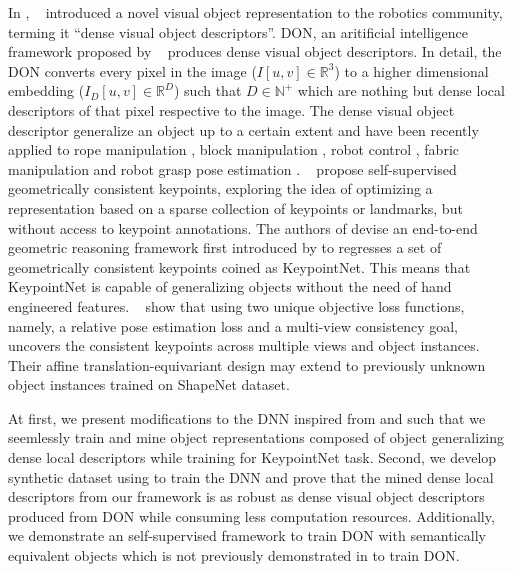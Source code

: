 In \citeyear{florence2018dense}, \citeauthor{florence2018dense}~\cite{florence2018dense} introduced a novel visual
object representation to the robotics community,  terming it ``dense visual object descriptors''. DON, an aritificial intelligence
framework proposed by
~\cite{florence2018dense} produces dense visual object descriptors. In detail, the DON converts every pixel in the
image ($I[u, v] \in \mathbb{R}^3$) to a higher dimensional embedding ($I_D[u, v] \in \mathbb{R}^D$) such that $D \in \mathbb{N}^+$
which are nothing but dense local descriptors
of that pixel respective to the image. The dense visual object descriptor generalize an object up to a certain extent and have been recently
applied to rope manipulation \cite{rope-manipulation},
block manipulation \cite{block-manipulation}, robot control \cite{florence2019self}, fabric manipulation \cite{fabric-manipulation} and
robot grasp pose estimation \parencites{kupcsik2021supervised}{adrian2022efficient}. \citeauthor{suwajanakorn2018discovery}~\cite{suwajanakorn2018discovery}
propose self-supervised geometrically consistent keypoints, exploring the idea of optimizing a representation
based on a sparse collection of keypoints or landmarks, but without access to keypoint annotations. The authors of \cite{suwajanakorn2018discovery}
devise an end-to-end geometric reasoning framework
first introduced by \cite{levine2016end} to regresses a set of geometrically consistent keypoints coined as KeypointNet.
This means that KeypointNet is capable of generalizing objects without the need of hand engineered features.
\citeauthor{suwajanakorn2018discovery}~\cite{suwajanakorn2018discovery} show that using two unique objective loss
functions, namely, a relative pose
estimation loss and a multi-view consistency goal, uncovers the consistent keypoints across multiple views and object instances.
Their affine translation-equivariant design may extend to
previously unknown object instances trained on ShapeNet \cite{chang2015shapenet} dataset.

At first, we present modifications to the DNN inspired from \cite{florence2018dense} and \cite{suwajanakorn2018discovery} such that we seemlessly
train and mine object representations composed of object generalizing dense local descriptors while training for KeypointNet task. Second, we develop synthetic
dataset using \cite{blenderproc} to train the DNN and prove that
the mined dense local descriptors from our framework is as robust as dense visual object descriptors produced from DON while consuming less computation resources.
Additionally, we demonstrate an self-supervised framework to train DON with semantically equivalent objects which is not
previously demonstrated in \parencites{florence2018dense}{florence2020dense}{kupcsik2021supervised}{adrian2022efficient}{hadjivelichkov2021fully}{nerf-Supervision} to train DON.